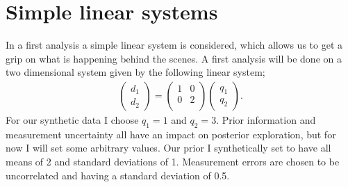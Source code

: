 \section{Simple linear systems}
In a first analysis a simple linear system is considered, which allows us to get a grip on what is happening behind the scenes. A first analysis will be done on a two dimensional system given by the following linear system;
\begin{gather}
	\begin{pmatrix}
	d_1\\
	d_2
	\end{pmatrix}
	=
	\begin{pmatrix}
	1 & 0\\
	0 & 2\\
	\end{pmatrix}
	\begin{pmatrix}
	q_1\\q_2
	\end{pmatrix}.
\end{gather}
For our synthetic data I choose $q_1 = 1$ and $q_2 = 3$. Prior information and measurement uncertainty all have an impact on posterior exploration, but for now I will set some arbitrary values. Our prior I synthetically set to have all means of 2 and standard deviations of 1. Measurement errors are chosen to be uncorrelated and having a standard deviation of 0.5.


